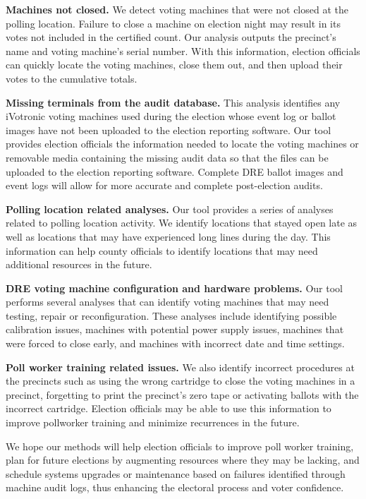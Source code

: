 \textbf{Machines not closed.} We detect voting machines that were not closed at the polling location. Failure to close a machine on election night may result in its votes not included in the certified count. Our analysis outputs the precinct's name and voting machine's serial number. With this information, election officials can quickly locate the voting machines, close them out, and then upload their votes to the cumulative totals.

\textbf{Missing terminals from the audit database.} This analysis identifies any iVotronic voting machines used during the election whose event log or ballot images have not been uploaded to the election reporting software. Our tool provides election officials the information needed to locate the voting machines or removable media containing the missing audit data so that the files can be uploaded to the election reporting software. Complete DRE ballot images and event logs will allow for more accurate and complete post-election audits.

\textbf{Polling location related analyses.} Our tool provides a series of analyses related to polling location activity. We identify locations that stayed open late as well as locations that may have experienced long lines during the day. This information can help county officials to identify locations that may need additional resources in the future. 

\textbf{DRE voting machine configuration and hardware problems.} Our tool performs several analyses that can identify  voting machines that may need testing, repair or reconfiguration. These analyses include identifying possible calibration issues, machines with potential power supply issues, machines that were forced to close early, and machines with incorrect date and time settings.

\textbf{Poll worker training related issues.} We also identify incorrect procedures at the precincts such as using the wrong cartridge to close the voting machines in a precinct, forgetting to print the precinct's zero tape or activating ballots with the incorrect cartridge. Election officials may be able to use this information to improve pollworker training and minimize recurrences in the future.

We hope our methods will help election officials to improve poll worker training, plan for future elections by augmenting resources where they may be lacking, and schedule systems upgrades or maintenance based on failures identified through machine audit logs, thus enhancing the electoral process and voter confidence.

